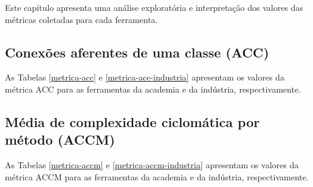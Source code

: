 {Este capítulo apresenta uma análise exploratória e interpretação dos valores das métricas coletadas para cada ferramenta.}
\label{analise-metricas}

\subsection{Conexões aferentes de uma classe (ACC)}

As Tabelas \ref{metrica-acc} e \ref{metrica-acc-industria} apresentam os
valores da métrica ACC para as ferramentas da academia e da indústria,
respectivamente.



\subsection{Média de complexidade ciclomática por método (ACCM)}

As Tabelas \ref{metrica-accm} e \ref{metrica-accm-industria} apresentam os
valores da métrica ACCM para as ferramentas da academia e da indústria,
respectivamente.


